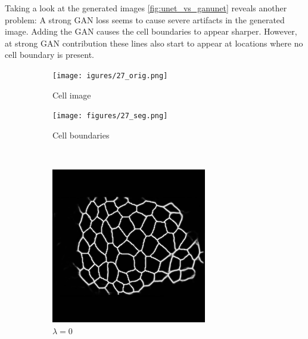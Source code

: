 \documentclass[aps,prl,twocolumn,groupedaddress,amsmath,amssymb]{revtex4-1}
\begin{document}
    Taking a look at the generated images \autoref{fig:unet_vs_ganunet}
    reveals another problem: A strong GAN loss seems to cause severe artifacts
    in the generated image. Adding the GAN causes the cell boundaries to
    appear sharper. However, at strong GAN contribution these lines also start
    to appear at locations where no cell boundary is present.

    \begin{figure}[tbp]
        \begin{subfigure}[c]{0.45\linewidth}
            \texttt{[image: igures/27\_orig.png]}
            \caption{Cell image}
        \end{subfigure} %
        \begin{subfigure}[c]{0.45\linewidth}
            \texttt{[image: figures/27\_seg.png]}
            \caption{Cell boundaries}
        \end{subfigure} \\
        \begin{subfigure}[c]{0.45\linewidth}
            \includegraphics[width=\linewidth]{figures/27-00.png}
            \caption{$\lambda=0$}
        \end{subfigure}%
        \begin{subfigure}[c]{0.45\linewidth}

\end{subfigure}
\end{figure}
\end{document}
